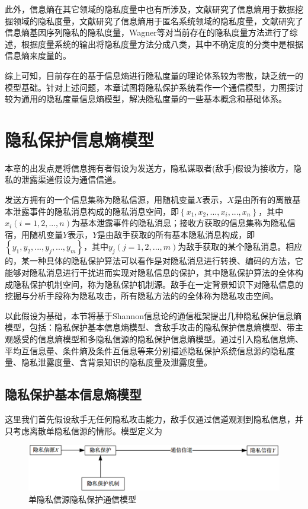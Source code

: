 此外，信息熵在其它领域的隐私度量中也有所涉及，文献\cite{agrawal2001design,zhan2007quantifying}研究了信息熵用于数据挖掘领域的隐私度量，文献\cite{edman2007combinatorial}研究了信息熵用于匿名系统领域的隐私度量，文献\cite{wagner2017evaluating}研究了信息熵基因序列隐私的隐私度量，Wagner等\cite{wagner2018technical}对当前存在的隐私度量方法进行了综述，根据度量系统的输出将隐私度量方法分成八类，其中不确定度的分类中是根据信息熵来度量的。

综上可知，目前存在的基于信息熵进行隐私度量的理论体系较为零散，缺乏统一的模型基础。针对上述问题，本章试图将隐私保护系统看作一个通信模型，力图探讨较为通用的隐私度量信息熵模型，解决隐私度量的一些基本概念和基础体系。

\section{隐私保护信息熵模型}\label{sec:Entropy model of privacy protection information}

本章的出发点是将信息拥有者假设为发送方，隐私谋取者(敌手)假设为接收方，隐私的泄露渠道假设为通信信道。

发送方拥有的一个信息集称为隐私信源，用随机变量$X$表示，$X$是由所有的离散基本泄露事件的隐私消息构成的隐私消息空间，即$\left \{ x_{1},x_{2},...,x_{i},...,x_{n} \right \}$，其中$x_{i}(i=1,2,...,n)$为基本泄露事件的隐私消息；接收方获取的信息集称为隐私信宿，用随机变量$Y$表示，$Y$是由敌手获取的所有基本隐私消息构成，即$\left \{y_{1},y_{2},...,y_{j},...,y_{m} \right \}$，其中$y_{j}(j=1,2,...,m)$为敌手获取的某个隐私消息。相应的，某一种具体的隐私保护算法可以看作是对隐私消息进行转换、编码的方法，它能够对隐私消息进行干扰进而实现对隐私信息的保护，其中隐私保护算法的全体构成隐私保护机制空间，称为隐私保护机制源。敌手在一定背景知识下对隐私信息的挖掘与分析手段称为隐私攻击，所有隐私方法的的全体称为隐私攻击空间。

以此假设为基础，本节将基于Shannon信息论的通信框架\cite{stone2018information}提出几种隐私保护信息熵模型，包括：隐私保护基本信息熵模型、含敌手攻击的隐私保护信息熵模型、带主观感受的信息熵模型和多隐私信源的隐私保护信息熵模型。通过引入隐私信息熵、平均互信息量、条件熵及条件互信息等来分别描述隐私保护系统信息源的隐私度量、隐私泄露度量、含背景知识的隐私度量及泄露度量。

\subsection{隐私保护基本信息熵模型}

这里我们首先假设敌手无任何隐私攻击能力，敌手仅通过信道观测到隐私信息，并只考虑离散单隐私信源的情形。模型定义为
\begin{figure}[htbp]
	\centering
	\includegraphics[width = 0.95\linewidth]{./figures/Communication-Model-for-Privacy.png}
	\caption{单隐私信源隐私保护通信模型}
	\label{fig:communication-model-privacy}
\end{figure}

